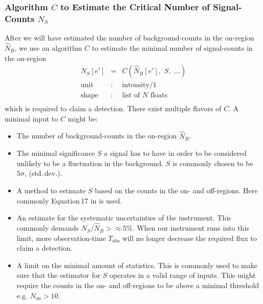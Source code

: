 \documentclass{article}%
\begin{document}
        \subsubsection*{Algorithm $C$ to Estimate the Critical Number of Signal-Counts $N_S$}
            After we will have estimated the number of background-counts in the on-region $\hat{N}_B$, we use an algorithm $C$ to estimate the minimal number of signal-counts in the on-region
            \begin{eqnarray*}
                N_S[e'] &=& C(\hat{N}_B[e'],\,\,S,\,\,\dots)\\
                \text{unit} &:& \text{intensity}/1\\
                \text{shape} &:& \text{list of}\,\,N\,\,\text{floats}\\
            \end{eqnarray*}
            which is required to claim a detection.
            There exist multiple flavors of $C$.
            A minimal input to $C$ might be:
            \begin{itemize}
                \item{} The number of background-counts in the on-region $\hat{N}_B$.
                \item{} The minimal significance $S$ a signal has to have in order to be considered unlikely to be a fluctuation in the background.
                $S$ is commonly chosen to be $5\sigma$, (std.\,dev.).
                \item{} A method to estimate $S$ based on the counts in the on- and off-regions. Here commonly Equation\,17 in \cite{li1983analysis} is used.
                \item{} An estimate for the systematic uncertainties of the instrument. This commonly demands $N_S/\hat{N}_B >\approx 5\%$.
                When our instrument runs into this limit, more observation-time $T_\text{obs}$ will no longer decrease the required flux to claim a detection.
                \item{}
                A limit on the minimal amount of statistics. This is commonly used to make sure that the estimator for $S$ operates in a valid range of inputs.
                This might require the counts in the on- and off-regions to be above a minimal threshold e.g. $N_\text{on} > 10$.
            \end{itemize}
\end{document}
